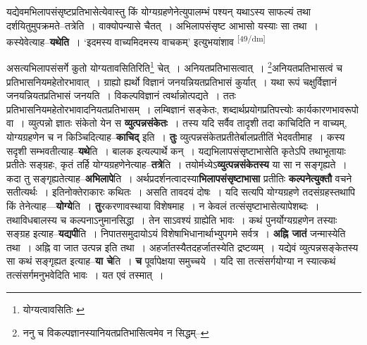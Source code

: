 \documentclass[article,12pt,a4paper]{memoir}
\begin{document}
	  \pstart यद्येवमभिलापसंसृष्टप्रतिभासेत्येवास्तु किं योग्यग्रहणेनेत्युपालम्भं पश्यन् यथाऽस्य साफल्यं तथा दर्शयितुमुपक्रमते--तत्रेति । वाक्योपन्यासे चैतत् । अभिलापसंसृष्ट आभासो यस्याः सा तथा । कस्येवेत्याह--\textbf{यथेति} । ‘इदमस्य वाच्यमिदमस्य वाचकम्’ इत्युभयांशाव  \leavevmode\textsuperscript{\rmlatinfont\tiny [49/dm]} 
	  
	असत्यभिलापसंसर्गे कुतो योग्यतावसितिरिति\footnote{योग्यत्वावसितिः \cite{dp-msC} \cite{dp-msD} \cite{dp-msB}} चेत् । अनियतप्रतिभासत्वात् । \footnote{ननु च विकल्पज्ञानस्यानियतप्रतिभासित्वमेव न सिद्धम्--\cite{dp-msD-n}}अनियतप्रतिभासत्वं च प्रतिभासनियमहेतोरभावात् । ग्राह्यो ह्यर्थो विज्ञानं जनयन्नियतप्रतिभासं कुर्यात् । यथा रूपं चक्षुर्विज्ञानं जनयन्नियतप्रतिभासं जनयति । विकल्पविज्ञानं त्वर्थान्नोत्पद्यते । ततः प्रतिभासनियमहेतोरभावादनियतप्रतिभासम् । लम्बिज्ञानं सङ्केतः, शब्दार्थप्रयोगप्रतिपत्त्योः कार्यकारणभावरूपो वा । व्युत्पन्नो ज्ञातः संकेतो येन स \textbf{व्युत्पन्नसंकेतः} । तस्य यदि सर्वैव तादृशी तदा काचिदिति न वाच्यम्, योग्यग्रहणेन च न किञ्चिदित्याह--\textbf{काचिद्} इति । \textbf{तुः} व्युत्पन्नसंकेतप्रतीतेर्बालप्रतीतिं भेदवतीमाह । कस्य सदृशी सम्भवतीत्याह--\textbf{यथे}ति । बालक इत्यल्पार्थे कन् । यद्यभिलापसंसृष्टाभासेति कृतेऽपि तथाभूतायाः प्रतीतेः सङ्ग्रहः, कृतं तर्हि योग्यग्रहणेनेत्याह--\textbf{तत्रे}ति । तयोर्मध्येऽ\textbf{व्युत्पन्नसंकेतस्य} या सा न सङ्गृह्यते । कदा तु सङ्गृह्यतेत्याह--\textbf{अभिलापे}ति । अर्थप्रदर्शनत्वादस्या\textbf{भिलापसंसृष्टाभासा} प्रतीतिः \textbf{कल्पनेत्युक्तौ} वचने सतीत्यर्थः । इतिनोक्तेराकारः कथितः । असति तावदयं दोषः । यदि सत्यपि योग्यग्रहणे तदसंग्रहस्तथापि किं तेनेत्याह—\textbf{योग्ये}ति । \textbf{तु}रकरणावस्थाया विशेषमाह । न केवलं तत्संसृष्टाभासेत्यापेशब्दः । तथाविधबालस्य च कल्पनाऽनुमानसिद्धा । तेन साऽवश्यं ग्राह्येति भावः । कथं पुनर्योग्यग्रहणेन तस्याः सङ्ग्रह इत्याह--\textbf{यद्यपी}ति । निपातसमुदायोऽयं विशेषाभिधानार्थाभ्युपगमे सर्वत्र । \textbf{अह्नि जातं} जन्मास्येति तथा । अह्नि वा जात उत्पन्न इति तथा । अहर्जातस्यैतदहर्जातस्येति द्रष्टव्यम् । यद्येवं व्युत्पन्नसङ्केतस्य सा कथं सङ्गृह्यत इत्याह--\textbf{या चे}ति । \textbf{च} पूर्वापेक्षया समुच्चये । यदि सा तत्संसर्गयोग्या न स्यात्कथं तत्संसर्गमनुभवेदिति भावः । यत एवं तस्मात् ।
	\pend
      
\end{document}
